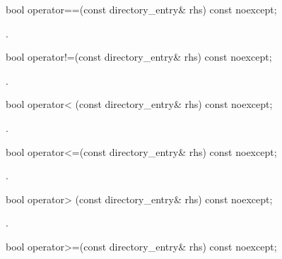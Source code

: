 %
\begin{itemdecl}
bool operator==(const directory_entry& rhs) const noexcept;
\end{itemdecl}

\begin{itemdescr}
\pnum
\returns {}.
\end{itemdescr}

%
\begin{itemdecl}
bool operator!=(const directory_entry& rhs) const noexcept;
\end{itemdecl}

\begin{itemdescr}
\pnum
\returns {}.
\end{itemdescr}

%
\begin{itemdecl}
bool operator< (const directory_entry& rhs) const noexcept;
\end{itemdecl}

\begin{itemdescr}
\pnum
\returns {}.
\end{itemdescr}

%
\begin{itemdecl}
bool operator<=(const directory_entry& rhs) const noexcept;
\end{itemdecl}

\begin{itemdescr}
\pnum
\returns {}.
\end{itemdescr}

%
\begin{itemdecl}
bool operator> (const directory_entry& rhs) const noexcept;
\end{itemdecl}

\begin{itemdescr}
\pnum
\returns {}.
\end{itemdescr}

%
\begin{itemdecl}
bool operator>=(const directory_entry& rhs) const noexcept;
\end{itemdecl}

